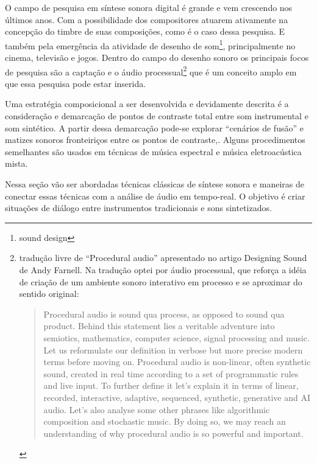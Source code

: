 \documentclass{ppgmus}
\begin{document}
O campo de pesquisa em síntese sonora digital é grande e vem crescendo
nos últimos anos. Com a possibilidade dos compositores atuarem ativamente
na concepção do timbre de suas composições, como é o caso dessa pesquisa. E
também pela emergência da atividade de desenho  de som\footnote{sound design}, 
principalmente no cinema, televisão e jogos. Dentro do campo do desenho
sonoro os principais focos de pesquisa são a captação e o áudio
processual\footnote{tradução livre de ``Procedural audio'' apresentado no artigo
 Designing Sound de Andy Farnell\cite{farnell2010designing}. Na tradução optei por
áudio processual, que reforça a idéia de criação de um ambiente sonoro interativo
em processo e se aproximar do sentido original:

\begin{quote}
 Procedural audio is sound qua process, as opposed to sound qua product. Behind this statement lies 
a veritable adventure into semiotics, mathematics, computer science, signal processing and music. 
Let us reformulate our definition in verbose but more precise modern terms before moving on. 
Procedural audio is non-linear, often synthetic sound, created in real time according to a set 
of programmatic rules and live input. To further define it let's explain it in terms of linear, 
recorded, interactive, adaptive, sequenced, synthetic, generative and AI audio. 
Let's also analyse some other phrases like algorithmic composition and stochastic music. 
By doing so, we may reach an understanding of why procedural audio is so powerful and important.
\end{quote} 
} que é um conceito amplo em que essa pesquisa pode estar inserida. 

Uma estratégia composicional a ser desenvolvida e devidamente
descrita é a consideração e demarcação de pontos de contraste total
entre som instrumental e som sintético. A partir dessa demarcação pode-se
explorar ``cenários de fusão'' e matizes sonoros fronteiriços entre
os pontos de contraste,. Alguns procedimentos semelhantes são usados
em técnicas de música espectral e música eletroacústica mista.

Nessa seção vão ser abordadas técnicas clássicas de síntese sonora
e maneiras de conectar essas técnicas com a análise
de áudio em tempo-real. O objetivo é criar situações
de diálogo entre instrumentos tradicionais e sons sintetizados.
\end{document}
